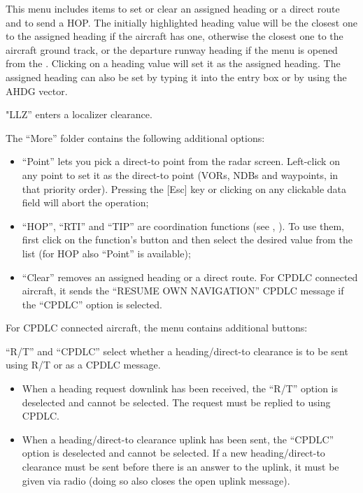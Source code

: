 \documentclass[a4paper,oneside,11pt]{memoir}
\begin{document}

This menu includes items to set or clear an assigned heading or a direct route and to send a HOP. The initially highlighted heading value will be the closest one to the assigned heading if the aircraft has one, otherwise the closest one to the aircraft ground track, or the departure runway heading if the menu is opened from the . Clicking on a heading value will set it as the assigned heading. The assigned heading can also be set by typing it into the entry box or by using the AHDG vector.

\bigskip

"LLZ” enters a localizer clearance.

\bigskip

The “More” folder contains the following additional options:

\begin{itemize}
  \item “Point” lets you pick a direct-to point from the radar screen. Left-click on any point to set it as the direct-to point (VORs, NDBs and waypoints, in that priority order). Pressing the [Esc] key or clicking on any clickable data field will abort the operation;
  \item “HOP”, “RTI” and “TIP” are coordination functions (see , ). To use them, first click on the function’s button and then select the desired value from the list (for HOP also “Point” is available);
  \item “Clear” removes an assigned heading or a direct route. For CPDLC connected aircraft, it sends the “RESUME OWN NAVIGATION” CPDLC message if the “CPDLC” option is selected.
\end{itemize}


\bigskip

For CPDLC connected aircraft, the menu contains additional buttons:

\bigskip

“R/T” and “CPDLC” select whether a heading/direct-to clearance is to be sent using R/T or as a CPDLC message.

\bigskip

\begin{itemize}
        \item When a heading request downlink has been received, the “R/T” option is deselected
    and cannot be selected. The request must be replied to using CPDLC.
        \item When a heading/direct-to clearance uplink has been sent, the “CPDLC” option is deselected and cannot be selected. If a new heading/direct-to clearance must be sent before there is an answer to the uplink, it must be given via radio (doing so also closes the open uplink message).
\end{itemize}
\end{document}
